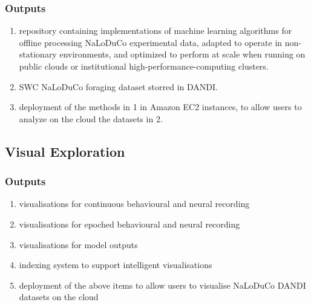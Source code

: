 \documentclass[12pt]{article}
\begin{document}
\subsubsection{Outputs}
\label{sec:outputsOfflineAnalysis}

\begin{enumerate}

    \item repository containing implementations of machine learning algorithms
        for offline processing NaLoDuCo experimental data, adapted to operate
        in non-stationary environments, and optimized to perform at scale when
        running on public clouds or institutional
        high-performance-computing clusters.

    \item SWC NaLoDuCo foraging dataset storred in DANDI.

    \item deployment of the methods in 1 in Amazon EC2 instances, to allow
        users to analyze on the cloud the datasets in 2.

\end{enumerate}

\subsection{Visual Exploration}
\label{sec:visualExploration}

\subsubsection{Outputs}

\begin{enumerate}

    \item visualisations for continuous behavioural and neural recording

    \item visualisations for epoched behavioural and neural recording

    \item visualisations for model outputs

    \item indexing system to support intelligent visualisations

    \item deployment of the above items to allow users to visualise NaLoDuCo
        DANDI datasets on the cloud

\end{enumerate}
\end{document}
